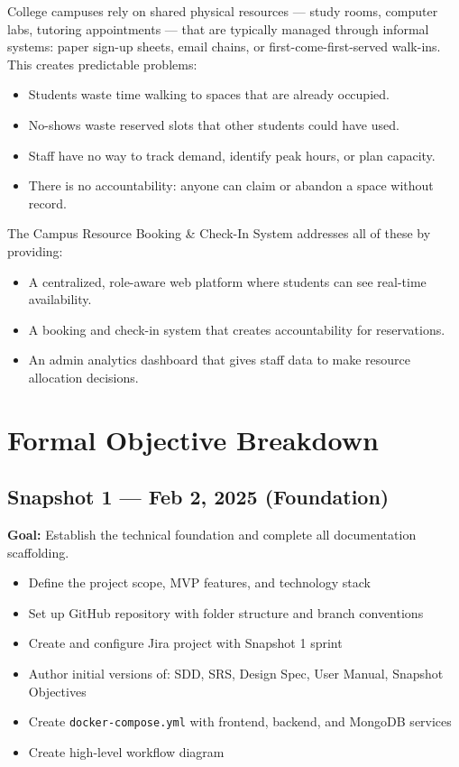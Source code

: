\documentclass[12pt]{article}
\begin{document}
College campuses rely on shared physical resources --- study rooms, computer labs, tutoring appointments --- that are typically managed through informal systems: paper sign-up sheets, email chains, or first-come-first-served walk-ins. This creates predictable problems:

\begin{itemize}
    \item Students waste time walking to spaces that are already occupied.
    \item No-shows waste reserved slots that other students could have used.
    \item Staff have no way to track demand, identify peak hours, or plan capacity.
    \item There is no accountability: anyone can claim or abandon a space without record.
\end{itemize}

The Campus Resource Booking \& Check-In System addresses all of these by providing:
\begin{itemize}
    \item A centralized, role-aware web platform where students can see real-time availability.
    \item A booking and check-in system that creates accountability for reservations.
    \item An admin analytics dashboard that gives staff data to make resource allocation decisions.
\end{itemize}

\section{Formal Objective Breakdown}

\subsection{Snapshot 1 --- Feb 2, 2025 (Foundation)}
\textbf{Goal:} Establish the technical foundation and complete all documentation scaffolding.
\begin{itemize}
    \item Define the project scope, MVP features, and technology stack
    \item Set up GitHub repository with folder structure and branch conventions
    \item Create and configure Jira project with Snapshot 1 sprint
    \item Author initial versions of: SDD, SRS, Design Spec, User Manual, Snapshot Objectives
    \item Create \texttt{docker-compose.yml} with frontend, backend, and MongoDB services
    \item Create high-level workflow diagram
\end{itemize}
\end{document}
